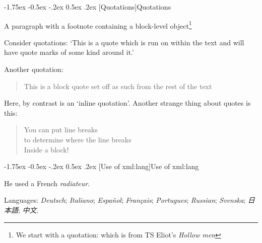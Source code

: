 \documentclass[11pt,twoside]{article}\makeatletter
\makeatletter
\renewcommand\section{\@startsection {section}{1}{\z@}%
     {-1.75ex \@plus -0.5ex \@minus -.2ex}%
     {0.5ex \@plus .2ex}%
     {\reset@font\Large\bfseries\sffamily}}
\makeatother
\begin{document}
\section[{Quotations}]{Quotations}\par
A paragraph with a footnote containing a block-level object\footnote{We start with a quotation:
 which is from TS Eliot's \textit{Hollow men}}\par
Consider quotations: ‘This is a quote which is run on within the text and will have quote marks of some kind around it.’\par
Another quotation: \begin{quote}This is a block quote set off as such from the rest of the text\end{quote}\par
Here, by contrast is an ‘inline quotation’. Another strange thing about quotes is this: \begin{quote}You can put line breaks{\hskip1pt}\\{}to determine where the line breaks{\hskip1pt}\\{}Inside a block!\end{quote}
\section[{Use of xml:lang}]{Use of xml:lang}\par
He used a French \textit{radiateur}.\par
Languages: \textit{Deutsch}; \textit{Italiano}; \textit{Español}; \textit{Français}; \textit{Portugues}; \textit{Russian}; \textit{Svenska}; \textit{日本語}; \textit{中文}.
\end{document}
